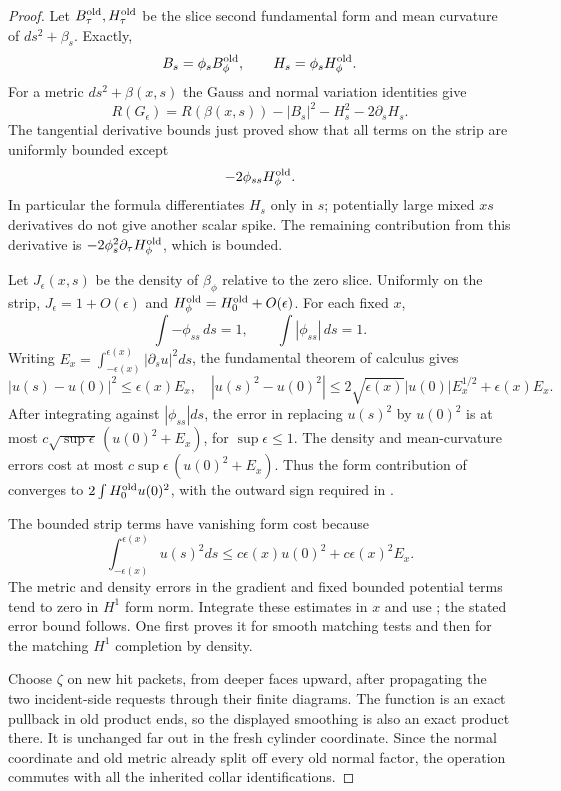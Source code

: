 \documentclass[11pt]{article}
\numberwithin{equation}{section}
\theoremstyle{definition}
\theoremstyle{remark}
\begin{document}
\begin{proof}
Let $B^{\rm old}_\tau,H^{\rm old}_\tau$ be the slice second
fundamental form and mean curvature of $ds^2+\beta_s$.  Exactly,
\[
 B_s=\phi_sB^{\rm old}_{\phi},\qquad
 H_s=\phi_sH^{\rm old}_{\phi}.
\]
For a metric $ds^2+\beta(x,s)$ the Gauss and normal variation
identities give
\[
 R(G_\epsilon)=R(\beta(x,s))-|B_s|^2-H_s^2-2\partial_sH_s.
\]
The tangential derivative bounds just proved show that all terms on
the strip are uniformly bounded except
\begin{equation}\label{regular:spike}
 -2\phi_{ss}H^{\rm old}_{\phi}.
\end{equation}
In particular the formula differentiates $H_s$ only in $s$;
potentially large mixed $xs$ derivatives do not give another scalar
spike.  The remaining contribution from this derivative is
$-2\phi_s^2\partial_\tau H^{\rm old}_\phi$, which is bounded.

Let $J_\epsilon(x,s)$ be the density of $\beta_\phi$ relative to
the zero slice.  Uniformly on the strip,
$J_\epsilon=1+O(\epsilon)$ and
$H^{\rm old}_\phi=H^{\rm old}_0+O(\epsilon)$.
For each fixed $x$,
\[
 \int-\phi_{ss}\,ds=1,\qquad
 \int|\phi_{ss}|\,ds=1.
\]
Writing $E_x=\int_{-\epsilon(x)}^{\epsilon(x)}|\partial_su|^2ds$,
the fundamental theorem of calculus gives
\[
 |u(s)-u(0)|^2\le\epsilon(x)E_x,
 \quad
 |u(s)^2-u(0)^2|
 \le2\sqrt{\epsilon(x)}|u(0)|E_x^{1/2}+\epsilon(x)E_x.
\]
After integrating against $|\phi_{ss}|ds$, the error in replacing
$u(s)^2$ by $u(0)^2$ is at most
$c\sqrt{\sup\epsilon}\,(u(0)^2+E_x)$, for $\sup\epsilon\le1$.
The density and mean-curvature errors cost at most
$c\sup\epsilon\,(u(0)^2+E_x)$.  Thus the form contribution of
 converges to
$2\int H^{\rm old}_0u(0)^2$, with the outward sign required in
.

The bounded strip terms have vanishing form cost because
\[
 \int_{-\epsilon(x)}^{\epsilon(x)}u(s)^2ds
 \le c\epsilon(x)u(0)^2+c\epsilon(x)^2E_x.
\]
The metric and density errors in the gradient and fixed bounded
potential terms tend to zero in $H^1$ form norm.  Integrate these
estimates in $x$ and use ; the stated error bound
follows.  One first proves it for smooth matching tests and then for
the matching $H^1$ completion by density.

Choose $\zeta$ on new hit packets, from deeper faces upward, after
propagating the two incident-side requests through their finite
diagrams.  The function is an exact pullback in old product ends, so
the displayed smoothing is also an exact product there.  It is
unchanged far out in the fresh cylinder coordinate.  Since the normal
coordinate and old metric already split off every old normal factor,
the operation commutes with all the inherited collar identifications.
\end{proof}
\end{document}
